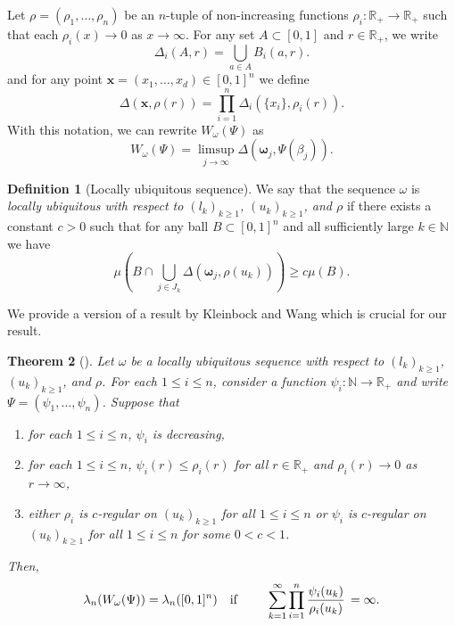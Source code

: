 \documentclass{amsart}
\newtheorem{theorem}{Theorem}[section]
\theoremstyle{definition}
\newtheorem{definition}[theorem]{Definition}
\newcommand{\N}{\mathbb N}%
\newcommand{\R}{\mathbb R}
\newcommand{\0}{\mbf 0}%
\renewcommand{\text}{\textup}
\def\N{\mathbb N}
\def\R{\mathbb R}
\begin{document}
Let $\rho=(\rho_{1}, \dots , \rho_{n})$ be an $n$-tuple of non-increasing functions $\rho_{i}: \R_{+} \to \R_{+}$ such that each $\rho_{i}(x) \to 0$ as $x\to \infty$. 
For any set $A\subset [0,1]$ and $r \in \R_{+}$, we write
\begin{equation*}
\Delta_{i}(A,r)= \bigcup_{a \in A}B_{i}(a,r).
\end{equation*}
and for any point $\mathbf{x}=(x_1,\ldots, x_d)\in [0,1]^n$ we define
\begin{equation*}
\Delta(\mathbf{x},\rho(r))= \prod_{i=1}^{n}  \Delta_{i}(\{x_i\},\rho_{i}(r)).
\end{equation*}
With this notation, we can rewrite $W_{\omega}(\Psi)$ as
\[
W_{\omega}(\Psi)
=
\limsup_{j\to\infty} \Delta\left( \boldsymbol{\omega}_j , \Psi(\beta_{j}) \right).
\]


\begin{definition}[Locally ubiquitous sequence]\rm
We say that the sequence $\omega$ is \textit{locally ubiquitous with respect to $(l_k)_{k\geq 1}$, $(u_k)_{k\geq 1}$, and $\rho$} if there exists a constant $c>0$ such that for any ball $B \subset [0,1]^n$ and all sufficiently large $k \in \N$ we have
\begin{equation*}
\mu \left( B \cap \bigcup_{j \in J_{k}}\Delta( \boldsymbol{\omega}_j, \rho(u_{k})) \right) \geq c \mu(B).
\end{equation*}
\end{definition}





We provide a version of a result by Kleinbock and Wang \cite{KW23} which is crucial for our result. 
\begin{theorem}[{\cite[Theorem 2.5]{KW23}}] \label{KW ambient measure}
Let $\omega$ be a locally ubiquitous sequence with respect to $(l_k)_{k\geq 1}$, $(u_k)_{k\geq 1}$, and $\rho$.
For each $1\leq i \leq n$, consider a function $\psi_{i}:\N\to\R_{+}$ and write $\Psi=(\psi_1, \ldots,\psi_n)$.
Suppose that
    \begin{enumerate}
        \item[\rm (I)] for each $1\leq i \leq n$,  $\psi_{i}$ is decreasing,
        \item[\rm (II)] for each $1\leq i \leq n$,  $\psi_{i}(r) \leq \rho_{i}(r)$ for all $r\in\R_{+}$ and $\rho_{i}(r)\to 0$ as $r\to \infty$,
        \item[\rm (III)] either $\rho_{i}$ is $c$-regular on $( u_{k})_{k\geq 1}$ for all $1\leq i \leq n$ or $\psi_{i}$ is $c$-regular on $ ( u_{k})_{k\geq 1}$ for all $1\leq i \leq n$ for some $0<c<1$.
    \end{enumerate}
    Then,
    \begin{equation*}
        \lambda_n( W_{\omega} (\Psi))=\lambda_n([0,1]^n) \quad \text{\rm if }\quad  \quad \sum\limits_{k=1}^{\infty}\prod_{i=1}^{n} \frac{\psi_{i}(u_{k})}{\rho_{i}(u_{k})}  \, = \infty.
    \end{equation*}
\end{theorem}
\end{document}
